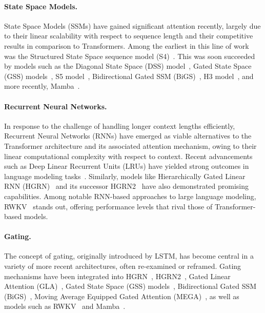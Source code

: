 \paragraph{State Space Models.} State Space Models (SSMs) have gained significant attention recently, largely due to their linear scalability with respect to sequence length and their competitive results in comparison to Transformers. Among the earliest in this line of work was the Structured State Space sequence model (S4)~\citep{Gu:21}. This was soon succeeded by models such as the Diagonal State Space (DSS) model~\citep{Gupta:22}, Gated State Space (GSS) models~\citep{Mehta:22}, S5 model~\citep{Smith:22}, Bidirectional Gated SSM (BiGS)~\citep{Wang:22}, H3 model~\citep{Fu:23}, and more recently, Mamba~\citep{Gu:24arxiv}.

\paragraph{Recurrent Neural Networks.} In response to the challenge of handling longer context lengths efficiently, Recurrent Neural Networks (RNNs) have emerged as viable alternatives to the Transformer architecture and its associated attention mechanism, owing to their linear computational complexity with respect to context. Recent advancements such as Deep Linear Recurrent Units (LRUs) have yielded strong outcomes in language modeling tasks~\citep{Orvieto:23, De:24arxiv}. Similarly, models like Hierarchically Gated Linear RNN (HGRN)~\citep{Qin:23} and its successor HGRN2~\citep{Qin:24arxiv} have also demonstrated promising capabilities. Among notable RNN-based approaches to large language modeling, RWKV~\citep{Peng:23arxivshort,Peng:24arxivshort} stands out, offering performance levels that rival those of Transformer-based models.

\paragraph{Gating.}
The concept of gating, originally introduced by LSTM, has become central in a variety of more recent architectures, often re-examined or reframed. Gating mechanisms have been integrated into HGRN~\citep{Qin:23}, HGRN2~\citep{Qin:24arxiv}, Gated Linear Attention (GLA)~\citep{Yang:23arxiv}, Gated State Space (GSS) models~\citep{Mehta:22}, Bidirectional Gated SSM (BiGS)~\citep{Wang:22}, Moving Average Equipped Gated Attention (MEGA)~\citep{Ma:22}, as well as models such as RWKV~\citep{Peng:23arxivshort} and Mamba~\citep{Gu:24arxiv}.

